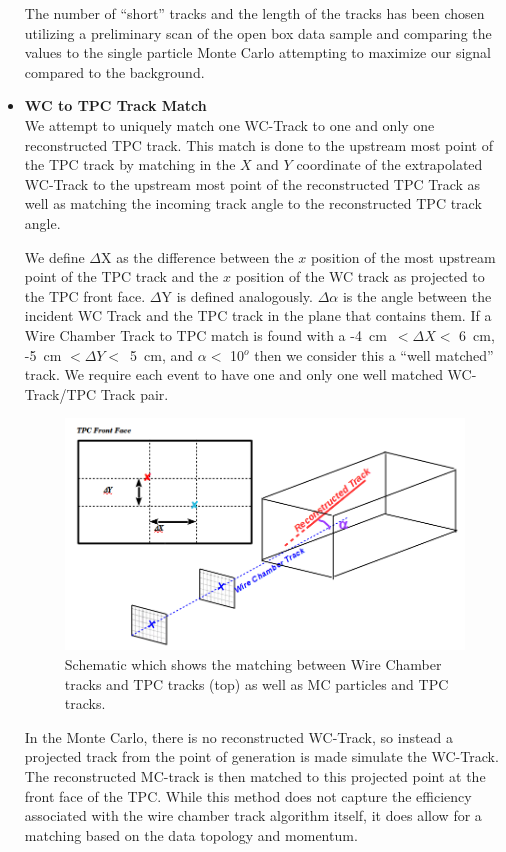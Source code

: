 \begin{itemize}
The number of ``short'' tracks and the length of the tracks has been chosen utilizing a preliminary scan of the open box data sample and comparing the values to the single particle Monte Carlo attempting to maximize our signal compared to the background.

\item{\textbf{WC to TPC Track Match}}\\

We attempt to uniquely match one WC-Track to one and only one reconstructed TPC track. This match is done to the upstream most point of the TPC track by matching in the $X$ and $Y$ coordinate of the extrapolated WC-Track to the upstream most point of the reconstructed TPC Track as well as matching the incoming track angle to the reconstructed TPC track angle.

We define $\Delta$X as the difference between the $x$ position of the most upstream point of the TPC track and the $x$ position of the WC track as projected to the TPC front face. $\Delta$Y is defined analogously. $\Delta\alpha$ is the angle between the incident WC Track and the TPC track in the plane that contains them. If a Wire Chamber Track to TPC match is found with a  -4~cm~$< \Delta X<$ 6~cm, -5~cm $ < \Delta Y< $~5~cm, and $\alpha < $ 10$^o$ then we consider this a ``well matched'' track. We require each event to have one and only one well matched WC-Track/TPC Track pair.

\begin{figure}[h!]
\centering
\includegraphics[scale=0.35]{./images/WCTPCMatchSchematic.png}
\caption{Schematic which shows the matching between Wire Chamber tracks and TPC tracks (top) as well as MC particles and TPC tracks.}
\label{fig:WCTrackMatching}
\end{figure}

In the Monte Carlo, there is no reconstructed WC-Track, so instead a projected track from the point of generation is made simulate the WC-Track. The reconstructed MC-track is then matched to this projected point at the front face of the TPC. While this method does not capture the efficiency associated with the wire chamber track algorithm itself, it does allow for a matching based on the data topology and momentum.

\end{itemize}

